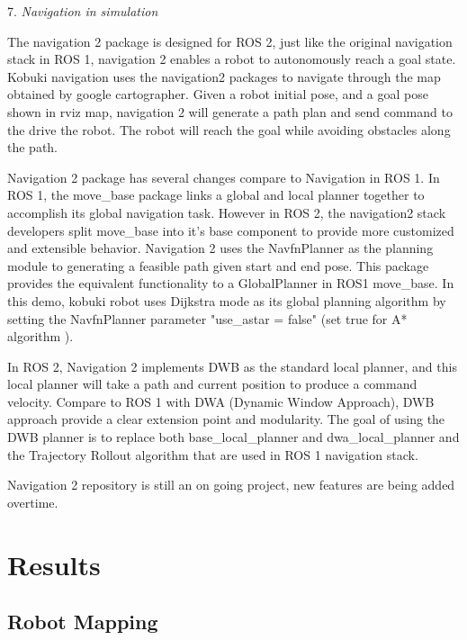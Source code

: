 \documentclass[letterpaper, 10 pt, conference]{ieeeconf}  %
\begin{document}
7. \textit{Navigation in simulation} \par\vspace{5pt} 
The navigation 2 package is designed for ROS 2, just like the original navigation stack in ROS 1, navigation 2 enables a robot to autonomously reach a goal state. Kobuki navigation uses the navigation2 packages to navigate through the map obtained by google cartographer. Given a robot initial pose, and a goal pose shown in rviz map, navigation 2 will generate a path plan and send command to the drive the robot. The robot will reach the goal while avoiding obstacles along the path. 
\par\vspace{5pt} 
Navigation 2 package has several changes compare to Navigation in ROS 1. In ROS 1, the move\_base package links a global and local planner together to accomplish its global navigation task\cite{c8}. However in ROS 2, the navigation2 stack developers split move\_base into it's base component to provide more customized and extensible behavior. Navigation 2 uses the NavfnPlanner as the planning module to generating a feasible path given start and end pose. This package provides the equivalent functionality to a GlobalPlanner in ROS1 move\_base. In this demo, kobuki robot uses Dijkstra mode as its global planning algorithm by setting the NavfnPlanner parameter "use\_astar = false" (set true for A* algorithm ). 
\par\vspace{5pt} 
In ROS 2, Navigation 2 implements DWB as the standard local planner, and this local planner will take a path and current position to produce a command velocity\cite{c9}. Compare to ROS 1 with DWA (Dynamic Window Approach), DWB approach provide a clear extension point and modularity. The goal of using the DWB planner is to replace both base\_local\_planner and dwa\_local\_planner and the Trajectory Rollout algorithm that are used in ROS 1 navigation stack. 
\par\vspace{5pt} 
Navigation 2 repository is still an on going project, new features are being added overtime. \par\vspace{8pt} 
\section{Results}\label{results}
\subsection{Robot Mapping}
\end{document}

